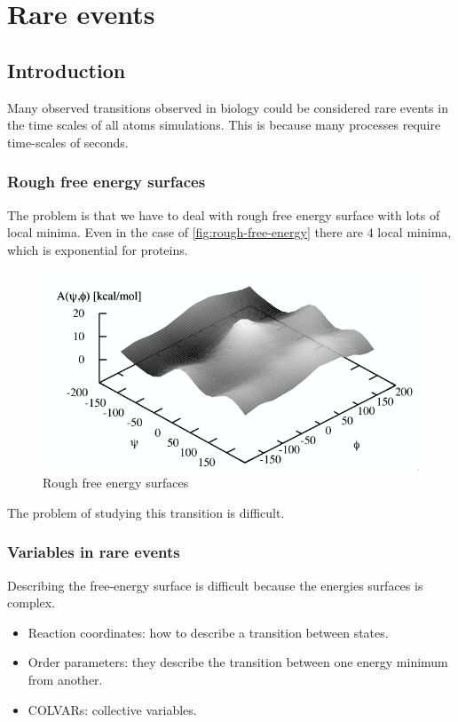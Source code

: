 \graphicspath{{chapters/19/images}}
\chapter{Rare events}

\section{Introduction}
Many observed transitions observed in biology could be considered rare events in the time scales of all atoms simulations.
This is because many processes require time-scales of seconds.

	\subsection{Rough free energy surfaces}
	The problem is that we have to deal with rough free energy surface with lots of local minima.
	Even in the case of \ref{fig:rough-free-energy} there are $4$ local minima, which is exponential for proteins.

	\begin{figure}[H]
		\includegraphics[width=\textwidth]{rough-free-energy-surfaces}
		\caption{Rough free energy surfaces}
		\label{fig:rough-free-energy-surfaces}
	\end{figure}

	The problem of studying this transition is difficult.

	\subsection{Variables in rare events}
	Describing the free-energy surface is difficult because the energies surfaces is complex.

		\begin{itemize}
			\item Reaction coordinates: how to describe a transition between states.
			\item Order parameters: they describe the transition between one energy minimum from another.
			\item COLVARs: collective variables.
		\end{itemize}

